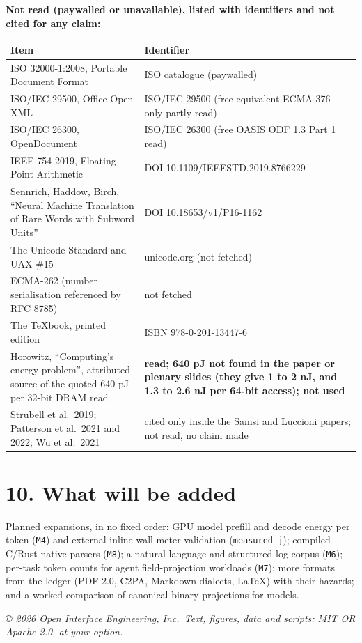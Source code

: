 \documentclass[10pt,letterpaper]{article}
\newcounter{none}
\begin{document}
\textbf{Not read (paywalled or unavailable), listed with identifiers and
not cited for any claim:}

{\def\LTcaptype{none} %
{\footnotesize\setlength{\tabcolsep}{3.8pt}\renewcommand{\arraystretch}{1.15}
\begin{longtable}[]{@{}
  >{\raggedright\arraybackslash}p{}
  >{\raggedright\arraybackslash}p{}@{}}
\toprule\noalign{}
\begin{minipage}[b]{\linewidth}\raggedright
\textbf{Item}
\end{minipage} & \begin{minipage}[b]{\linewidth}\raggedright
\textbf{Identifier}
\end{minipage} \\
\midrule\noalign{}
\endhead
\bottomrule\noalign{}
\endlastfoot
ISO 32000-1:2008, Portable Document Format & ISO catalogue
(paywalled) \\
ISO/IEC 29500, Office Open XML & ISO/IEC 29500 (free equivalent ECMA-376
only partly read) \\
ISO/IEC 26300, OpenDocument & ISO/IEC 26300 (free OASIS ODF 1.3 Part 1
read) \\
IEEE 754-2019, Floating-Point Arithmetic & DOI
10.1109/IEEESTD.2019.8766229 \\
Sennrich, Haddow, Birch, ``Neural Machine Translation of Rare Words with
Subword Units'' & DOI 10.18653/v1/P16-1162 \\
The Unicode Standard and UAX \#15 & unicode.org (not fetched) \\
ECMA-262 (number serialisation referenced by RFC 8785) & not fetched \\
The TeXbook, printed edition & ISBN 978-0-201-13447-6 \\
Horowitz, ``Computing's energy problem'', attributed source of the
quoted 640 pJ per 32-bit DRAM read & \textbf{read; 640 pJ not found in
the paper or plenary slides (they give 1 to 2 nJ, and 1.3 to 2.6 nJ per
64-bit access); not used} \\
Strubell et al.~2019; Patterson et al.~2021 and 2022; Wu et al.~2021 &
cited only inside the Samsi and Luccioni papers; not read, no claim
made \\
\end{longtable}
}
}

\section{10. What will be added}\label{what-will-be-added}

Planned expansions, in no fixed order: GPU model prefill and decode
energy per token (\texttt{M4}) and external inline wall-meter validation
(\texttt{measured\_j}); compiled C/Rust native parsers (\texttt{M8}); a
natural-language and structured-log corpus (\texttt{M6}); per-task token
counts for agent field-projection workloads (\texttt{M7}); more formats
from the ledger (PDF 2.0, C2PA, Markdown dialects, LaTeX) with their
hazards; and a worked comparison of canonical binary projections for
models.

\emph{© 2026 Open Interface Engineering, Inc.~Text, figures, data and
scripts: MIT OR Apache-2.0, at your option.}
\end{document}
